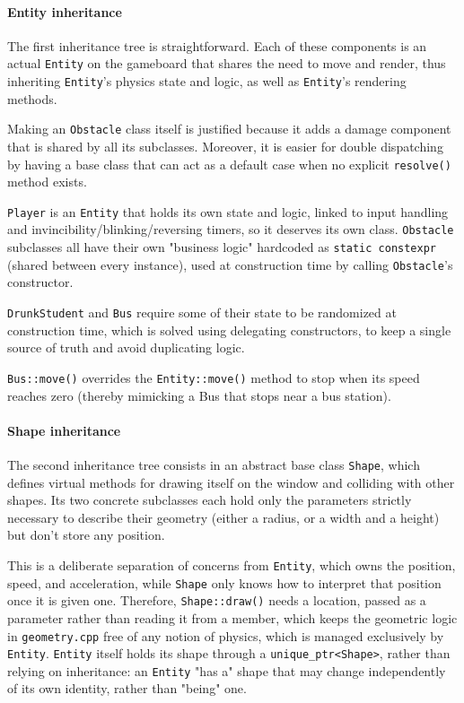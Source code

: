 \documentclass{article}
\begin{document}
\paragraph{Entity inheritance} \label{sec: entity_inheritance}

The first inheritance tree is straightforward. Each of these components is an actual \texttt{Entity} on the gameboard that shares the need to move and render, thus inheriting \texttt{Entity}'s physics state and logic, as well as \texttt{Entity}'s rendering methods.

Making an \texttt{Obstacle} class itself is justified because it adds a damage component that is shared by all its subclasses. Moreover, it is easier for double dispatching by having a base class that can act as a default case when no explicit \texttt{resolve()} method exists.

\texttt{Player} is an \texttt{Entity} that holds its own state and logic, linked to input handling and invincibility/blinking/reversing timers, so it deserves its own class. \texttt{Obstacle} subclasses all have their own "business logic" hardcoded as \texttt{static constexpr} (shared between every instance), used at construction time by calling \texttt{Obstacle}'s constructor. 

\texttt{DrunkStudent} and \texttt{Bus} require some of their state to be randomized at construction time, which is solved using delegating constructors, to keep a single source of truth and avoid duplicating logic. 

\texttt{Bus::move()} overrides the \texttt{Entity::move()} method to stop when its speed reaches zero (thereby mimicking a Bus that stops near a bus station).

\paragraph{Shape inheritance} \label{sec: shape_inheritance}

The second inheritance tree consists in an abstract base class \texttt{Shape}, which defines virtual methods for drawing itself on the window and colliding with other shapes. Its two concrete subclasses each hold only the parameters strictly necessary to describe their geometry (either a radius, or a width and a height) but don't store any position. 

This is a deliberate separation of concerns from \texttt{Entity}, which owns the position, speed, and acceleration, while \texttt{Shape} only knows how to interpret that position once it is given one. Therefore, \texttt{Shape::draw()} needs a location, passed as a parameter rather than reading it from a member, which keeps the geometric logic in \texttt{geometry.cpp} free of any notion of physics, which is managed exclusively by \texttt{Entity}. \texttt{Entity} itself holds its shape through a \texttt{unique\_ptr<Shape>}, rather than relying on inheritance: an \texttt{Entity} "has a" shape that may change independently of its own identity, rather than "being" one.
\end{document}
